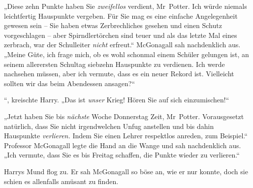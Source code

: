 „Diese zehn Punkte haben Sie \emph{zweifellos} verdient, Mr~Potter. Ich würde niemals leichtfertig Hauspunkte vergeben. Für Sie mag es eine einfache Angelegenheit gewesen sein – Sie haben etwas Zerbrechliches gesehen und einen Schutz vorgeschlagen – aber Spirndlertörchen sind teuer und als das letzte Mal eines zerbrach, war der Schulleiter \emph{nicht} erfreut.“ McGonagall sah nachdenklich aus. „Meine Güte, ich frage mich, ob es wohl schonmal einem Schüler gelungen ist, an seinem allerersten Schultag siebzehn Hauspunkte zu verdienen. Ich werde nachsehen müssen, aber ich vermute, dass es ein neuer Rekord ist. Vielleicht sollten wir das beim Abendessen ansagen?“ 

“, kreischte Harry. „Das ist \emph{unser} Krieg! Hören Sie auf sich einzumischen!“ 

„Jetzt haben Sie bis \emph{nächste} Woche Donnerstag Zeit, Mr~Potter. Vorausgesetzt natürlich, dass Sie nicht irgendwelchen Unfug anstellen und bis dahin Hauspunkte \emph{verlieren.} Indem Sie einen Lehrer respektlos anreden, zum Beispiel.“ Professor McGonagall legte die Hand an die Wange und sah nachdenklich aus. „Ich vermute, dass Sie es bis Freitag schaffen, die Punkte wieder zu verlieren.“ 

Harrys Mund flog zu. Er sah McGonagall so böse an, wie er nur konnte, doch sie schien es allenfalls amüsant zu finden. 

